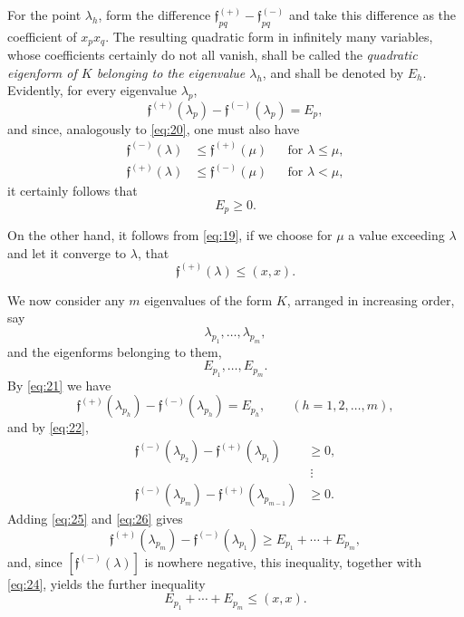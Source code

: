 \documentclass[b5paper,twoside]{article}
\newcommand{\originalpage}[1]{\phantomsection\label{origpage:#1}}
\begin{document}
For the point $\lambda_h$, form the difference
$\mathfrak f_{pq}^{(+)}-\mathfrak f_{pq}^{(-)}$ and take this difference as
the coefficient of $x_p x_q$.  The resulting quadratic form in infinitely
many variables, whose coefficients certainly do not all vanish, shall be
called the \emph{quadratic eigenform of $K$ belonging to the eigenvalue
$\lambda_h$}, and shall be denoted by $E_h$.  Evidently, for every eigenvalue
$\lambda_p$,
\begin{equation}
\tag{21}\label{eq:21}
  \mathfrak f^{(+)}(\lambda_p)
  -\mathfrak f^{(-)}(\lambda_p)=E_p,
\end{equation}
and since, analogously to \eqref{eq:20}, one must also have
\begin{equation}
\tag{22}\label{eq:22}
\begin{aligned}
  \mathfrak f^{(-)}(\lambda)&\le\mathfrak f^{(+)}(\mu)
    &&\text{for }\lambda\le\mu,\\
  \mathfrak f^{(+)}(\lambda)&\le\mathfrak f^{(-)}(\mu)
    &&\text{for }\lambda<\mu,
\end{aligned}
\end{equation}
it certainly follows that
\begin{equation}
\tag{23}\label{eq:23}
  E_p\ge0.
\end{equation}

\originalpage{170}
On the other hand, it follows from \eqref{eq:19}, if we choose for $\mu$ a
value exceeding $\lambda$ and let it converge to $\lambda$, that
\begin{equation}
\tag{24}\label{eq:24}
  \mathfrak f^{(+)}(\lambda)\le(x,x).
\end{equation}

We now consider any $m$ eigenvalues of the form $K$, arranged in increasing
order, say
\[
  \lambda_{p_1},\ldots,\lambda_{p_m},
\]
and the eigenforms belonging to them,
\[
  E_{p_1},\ldots,E_{p_m}.
\]
By \eqref{eq:21} we have
\begin{equation}
\tag{25}\label{eq:25}
  \mathfrak f^{(+)}(\lambda_{p_h})
  -\mathfrak f^{(-)}(\lambda_{p_h})=E_{p_h},
  \qquad(h=1,2,\ldots,m),
\end{equation}
and by \eqref{eq:22},
\begin{equation}
\tag{26}\label{eq:26}
\begin{aligned}
  \mathfrak f^{(-)}(\lambda_{p_2})
    -\mathfrak f^{(+)}(\lambda_{p_1})&\ge0,\\
  &\ \vdots\\
  \mathfrak f^{(-)}(\lambda_{p_m})
    -\mathfrak f^{(+)}(\lambda_{p_{m-1}})&\ge0.
\end{aligned}
\end{equation}
Adding \eqref{eq:25} and \eqref{eq:26} gives
\begin{equation}
\tag{27}\label{eq:27}
  \mathfrak f^{(+)}(\lambda_{p_m})
  -\mathfrak f^{(-)}(\lambda_{p_1})
  \ge E_{p_1}+\cdots+E_{p_m},
\end{equation}
and, since $[\mathfrak f^{(-)}(\lambda)]$ is nowhere negative, this inequality,
together with \eqref{eq:24}, yields the further inequality
\begin{equation}
\tag{28}\label{eq:28}
  E_{p_1}+\cdots+E_{p_m}\le(x,x).
\end{equation}
\end{document}
